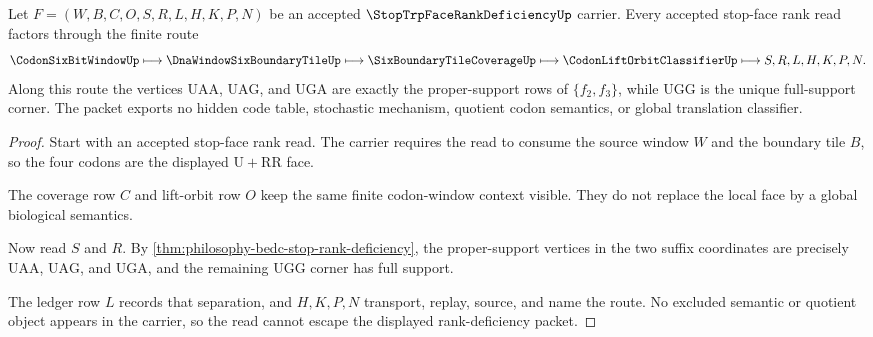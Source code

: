 \begin{theorem}
\label{thm:stop-trp-face-rank-deficiency-local-route}
Let $F=(W,B,C,O,S,R,L,H,K,P,N)$ be an accepted
$\StopTrpFaceRankDeficiencyUp$ carrier. Every accepted stop-face rank read
factors through the finite route
$$
\CodonSixBitWindowUp \longmapsto \DnaWindowSixBoundaryTileUp
\longmapsto \SixBoundaryTileCoverageUp
\longmapsto \CodonLiftOrbitClassifierUp
\longmapsto S,R,L,H,K,P,N .
$$
Along this route the vertices $\mathrm{UAA}$, $\mathrm{UAG}$, and
$\mathrm{UGA}$ are exactly the proper-support rows of $\{f_2,f_3\}$, while
$\mathrm{UGG}$ is the unique full-support corner. The packet exports no hidden
code table, stochastic mechanism, quotient codon semantics, or global
translation classifier.
\end{theorem}
\begin{proof}
Start with an accepted stop-face rank read. The carrier requires the read to
consume the source window $W$ and the boundary tile $B$, so the four codons are
the displayed $\mathrm{U}+\mathrm{RR}$ face.

The coverage row $C$ and lift-orbit row $O$ keep the same finite codon-window
context visible. They do not replace the local face by a global biological
semantics.

Now read $S$ and $R$. By
\autoref{thm:philosophy-bedc-stop-rank-deficiency}, the proper-support
vertices in the two suffix coordinates are precisely
$\mathrm{UAA}$, $\mathrm{UAG}$, and $\mathrm{UGA}$, and the remaining
$\mathrm{UGG}$ corner has full support.

The ledger row $L$ records that separation, and $H,K,P,N$ transport, replay,
source, and name the route. No excluded semantic or quotient object appears in
the carrier, so the read cannot escape the displayed rank-deficiency packet.
\end{proof}



